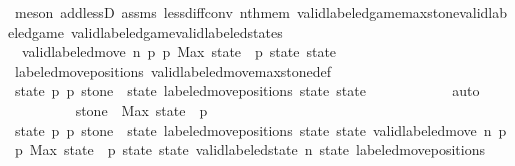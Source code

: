 \begin{isabellebody}
\ {\isacharparenleft}meson\ add{\isacharunderscore}lessD{}\ assms{\isacharparenleft}{}{\isacharparenright}\ less{\isacharunderscore}diff{\isacharunderscore}conv\ nth{\isacharunderscore}mem\ valid{\isacharunderscore}labeled{\isacharunderscore}game{\isacharunderscore}max{\isacharunderscore}stone{\isacharunderscore}valid{\isacharunderscore}labeled{\isacharunderscore}game\ valid{\isacharunderscore}labeled{\isacharunderscore}game{\isacharunderscore}valid{\isacharunderscore}labeled{\isacharunderscore}states{\isacharparenright}\ \ \ \ \ \ \ \ \ \ \isanewline
\ \ \ \ \ \ \ \ \isamarkupfalse%
\isanewline
\ \ \ \ \ \ \ \ \isamarkupfalse%
\ {\isacharasterisk}{\isacharcolon}\ {\isachardoublequoteopen}valid{\isacharunderscore}labeled{\isacharunderscore}move{\isacharprime}\ n\ p{}\ p{}\ {\isacharparenleft}Max\ {\isacharparenleft}state\ {\isacharbang}\ p{}{\isacharparenright}{\isacharparenright}\ state\ state{\isacharprime}{\isachardoublequoteclose}\isanewline
\ \ \ \ \ \ \ \ \ \ \isamarkupfalse%
\ labeled{\isacharunderscore}move{\isacharunderscore}positions\ valid{\isacharunderscore}labeled{\isacharunderscore}move{\isacharunderscore}max{\isacharunderscore}stone{\isacharunderscore}def\isanewline
\ \ \ \ \ \ \ \ \ \ \isamarkupfalse%
\ {\isacartoucheopen}{\isacharparenleft}state{\isacharcomma}\ p{}{\isacharcomma}\ p{}{\isacharcomma}\ stone{\isacharprime}{\isacharparenright}\ {\isacharequal}\ {\isacharparenleft}state{\isacharcomma}\ labeled{\isacharunderscore}move{\isacharunderscore}positions\ state\ state{\isacharprime}{\isacharparenright}{\isacartoucheclose}\isanewline
\ \ \ \ \ \ \ \ \ \ \isamarkupfalse%
\ auto\isanewline
\isanewline
\ \ \ \ \ \ \ \ \isamarkupfalse%
\ {\isachardoublequoteopen}stone{\isacharprime}\ {\isacharequal}\ Max\ {\isacharparenleft}state\ {\isacharbang}\ p{}{\isacharparenright}{\isachardoublequoteclose}\isanewline
\ \ \ \ \ \ \ \ \ \ \isamarkupfalse%
\ {\isacartoucheopen}{\isacharparenleft}state{\isacharcomma}\ p{}{\isacharcomma}\ p{}{\isacharcomma}\ stone{\isacharprime}{\isacharparenright}\ {\isacharequal}\ {\isacharparenleft}state{\isacharcomma}\ labeled{\isacharunderscore}move{\isacharunderscore}positions\ state\ state{\isacharprime}{\isacharparenright}{\isacartoucheclose}\ {\isacartoucheopen}valid{\isacharunderscore}labeled{\isacharunderscore}move{\isacharprime}\ n\ p{}\ p{}\ {\isacharparenleft}Max\ {\isacharparenleft}state\ {\isacharbang}\ p{}{\isacharparenright}{\isacharparenright}\ state\ state{\isacharprime}{\isacartoucheclose}\ {\isacartoucheopen}valid{\isacharunderscore}labeled{\isacharunderscore}state\ n\ state{\isacartoucheclose}\ labeled{\isacharunderscore}move{\isacharunderscore}positions\ \isamarkupfalse%

\end{isabellebody}
